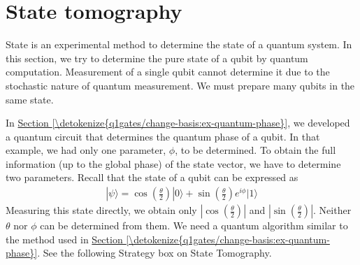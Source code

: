 \documentclass[letterpaper,10pt,english]{jupyterBook}
\begin{document}
\sphinxstepscope


\section{State tomography}
\label{\detokenize{q1gates/tomography:state-tomography}}\label{\detokenize{q1gates/tomography:sec-state-tomography}}\label{\detokenize{q1gates/tomography::doc}}
\sphinxAtStartPar
State  is an experimental method to determine the state of a quantum system. In this section, we try to determine the pure state of a qubit by quantum computation.   Measurement of a single qubit cannot determine it due to the stochastic nature of quantum measurement.  We must prepare many  qubits in the same state.

\sphinxAtStartPar
In \hyperref[\detokenize{q1gates/change-basis:ex-quantum-phase}]{Section \ref{\detokenize{q1gates/change-basis:ex-quantum-phase}}}, we developed a quantum circuit that determines the quantum phase of a qubit.  In that example, we had only one parameter, \(\phi\), to be determined. To obtain the full information (up to the global phase) of the state vector, we have to determine two parameters.  Recall that the state of a qubit can be expressed as
\begin{equation*}
\begin{split}
|\psi\rangle = \cos\left(\frac{\theta}{2}\right) |0\rangle + \sin\left(\frac{\theta}{2}\right) e^{i \phi}|1\rangle
\end{split}
\end{equation*}
\sphinxAtStartPar
Measuring this state directly, we obtain only \(\left|\cos\left(\frac{\theta}{2}\right)\right|\) and \(\left|\sin\left(\frac{\theta}{2}\right)\right|\). Neither \(\theta\) nor \(\phi\) can be determined from them. We need a quantum algorithm similar to the method used in \hyperref[\detokenize{q1gates/change-basis:ex-quantum-phase}]{Section \ref{\detokenize{q1gates/change-basis:ex-quantum-phase}}}.  See the following Strategy box on State Tomography.
\end{document}
